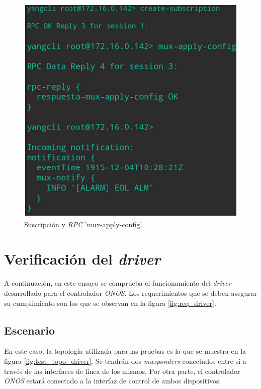   \begin{figure}[H]
	\centering
	\includegraphics[scale=0.6]{Figures/test3_consulta.png}
	\caption{Suscripción y  \textit{RPC} 'mux-apply-config'.}
	\label{fig:test3_consulta}
  \end{figure}




\section{Verificación del \textit{driver}}

A continuación, en este ensayo se comprueba el funcionamiento del \textit{driver} desarrollado para el controlador \textit{ONOS}. Los requerimientos que se deben asegurar su cumplimiento son los que se observan en la figura \ref{fig:req_driver}. 

\subsection{Escenario}

En este caso, la topología utilizada para las pruebas es la que se muestra en la figura \ref{fig:test_topo_driver}. Se tendrán dos \textit{muxponders} conectados entre sí a través de las interfaces de línea de los mismos. Por otra parte, el controlador \textit{ONOS} estará conectado a la interfaz de control de ambos dispositivos. 


